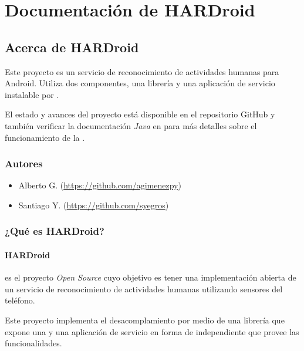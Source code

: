 
\chapter{Documentación de HARDroid}
\label{index:har-index}\label{index:hardroid}\label{index:human-activity-recognition-for-android}

\section{Acerca de HARDroid}
\label{index:bienvenido-a-la-documentacion-de-hardroid}
Este proyecto es un servicio de reconocimiento de actividades humanas
para Android. Utiliza dos componentes, una librería y una aplicación de servicio instalable por .

El estado y avances del proyecto está disponible en el repositorio GitHub \cite{GimenezYegros2016c} y también verificar la documentación \emph{Java} en \cite{GimenezYegros2016d} para más detalles sobre el funcionamiento de la .


\subsection{Autores}
\label{index:autores}\begin{itemize}
\item {} 
    Alberto G. (\url{https://github.com/agimenezpy})

\item {} 
    Santiago Y. (\url{https://github.com/syegros})

\end{itemize}
\label{index:har-content}

\subsection{¿Qué es HARDroid?}
\label{intro:har-intro}\label{intro::doc}\label{intro:que-es-hardroid}

\subsubsection{HARDroid}
\label{intro:hardroid}
 es el proyecto \emph{Open Source} cuyo objetivo es tener una implementación abierta de un servicio de
reconocimiento de actividades humanas utilizando sensores del teléfono.

Este proyecto implementa el desacomplamiento por medio de una librería que expone una  y una aplicación de servicio en forma de  independiente que provee las
funcionalidades.

